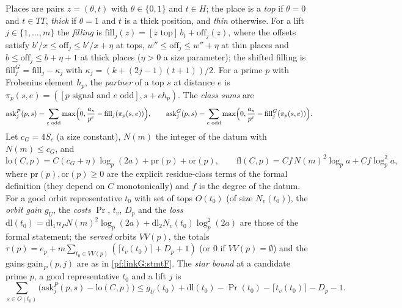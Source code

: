 \begin{definition}\label{pf:linkG:famdefs}
Places are pairs $z=(\theta,t)$ with $\theta\in\{0,1\}$ and $t\in H$; the place is a \emph{top} if $\theta=0$ and $t\in TT$, \emph{thick}
if $\theta=1$ and $t$ is a thick position, and \emph{thin} otherwise. For a lift $j\in\{1,\dots,m\}$ the \emph{filling} is
$\mathrm{fill}_j(z)=[z\text{ top}]\,b_t+\mathrm{off}_j(z)$, where the offsets satisfy $b'/x\le\mathrm{off}_j\le b'/x+\eta$ at tops,
$w''\le\mathrm{off}_j\le w''+\eta$ at thin places and $b\le\mathrm{off}_j\le b+\eta+1$ at thick places ($\eta>0$ a size parameter);
the shifted filling is $\mathrm{fill}^G_j=\mathrm{fill}_j-\kappa_j$ with $\kappa_j=(k+(2j-1)(t+1))/2$. For a prime $p$ with
Frobenius element $h_p$, the \emph{partner} of a top $s$ at distance $e$ is $\pi_p(s,e)=([p\text{ signal and }e\text{ odd}],s+eh_p)$.
The \emph{class sums} are
\[
\mathrm{ask}^P_j(p,s)=\sum_{e\text{ odd}}\max\Bigl(0,\frac{a_s}{p^e}-\mathrm{fill}_j(\pi_p(s,e))\Bigr),\qquad
\mathrm{ask}^G_j(p,s)=\sum_{e\text{ odd}}\max\Bigl(0,\frac{a_s}{p^e}-\mathrm{fill}^G_j(\pi_p(s,e))\Bigr).
\]
Let $c_G=4S_c$ (a size constant), $N(m)$ the integer of the datum with $N(m)\le c_G$, and
\[
\mathrm{lo}(C,p)=C(c_G+\eta)\log_p(2a)+\mathrm{pr}(p)+\mathrm{or}(p),\qquad
\mathrm{fl}(C,p)=Cf\,N(m)^2\log_pa+Cf\log_p^2a,
\]
where $\mathrm{pr}(p),\mathrm{or}(p)\ge0$ are the explicit residue-class terms of the formal definition (they depend on $C$
monotonically) and $f$ is the degree of the datum. For a good orbit representative $t_0$ with set of tops $O(t_0)$ (of size
$N_v(t_0)$), the \emph{orbit gain} $g_U$, the \emph{costs} $\Pr$, $t_v$, $D_p$ and the \emph{loss}
$\mathrm{dl}(t_0)=\mathrm{dl}_1n_PN(m)^2\log_p(2a)+\mathrm{dl}_2N_v(t_0)\log_p^2(2a)$ are those of the formal statement; the
\emph{served} orbits $VV(p)$, the totals $\tau(p)=e_p+m\sum_{t_0\in VV(p)}(\lceil t_v(t_0)\rceil+D_p+1)$ (or $0$ if $VV(p)=\emptyset$)
and the gains $\mathrm{gain}_P(p,j)$ are as in \cref{pf:linkG:stmtF}. The \emph{star bound} at a candidate prime $p$, a good
representative $t_0$ and a lift $j$ is
\begin{equation}\label{eq:pf:linkG:star}
\sum_{s\in O(t_0)}\bigl(\mathrm{ask}^P_j(p,s)-\mathrm{lo}(C,p)\bigr)\le g_U(t_0)+\mathrm{dl}(t_0)-\Pr(t_0)-\lceil t_v(t_0)\rceil-D_p-1 .
\end{equation}
\end{definition}


